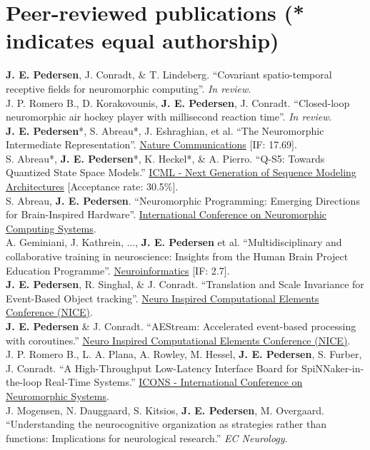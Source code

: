 \documentclass[11pt, a4paper]{article}
\newcommand{\years}[1]{\marginnote{\scriptsize #1}}
\begin{document}
\section*{Peer-reviewed publications {\small (* indicates equal authorship)}}
\years{2025}\textbf{J. E. Pedersen}, J. Conradt, \& T. Lindeberg. ``Covariant spatio-temporal receptive fields for neuromorphic computing''. \emph{In review}. \\
\years{2025}J. P. Romero B., D. Korakovounis, \textbf{J. E. Pedersen}, J. Conradt. ``Closed-loop neuromorphic air hockey player with millisecond reaction time''. \emph{In review}. \\
\years{2024}\textbf{J. E. Pedersen}*, S. Abreau*, J. Eshraghian, et al. ``The Neuromorphic Intermediate Representation''.
\href{https://www.nature.com/ncomms/}{Nature Communications} [IF: 17.69]. \\
\years{2024} S. Abreau*, \textbf{J. E. Pedersen}*, K. Heckel*, \& A. Pierro. ``Q-S5: Towards Quantized State Space Models.''
\href{https://icml.cc/virtual/2024/workshop/29962}{ICML - Next Generation of Sequence Modeling Architectures} [Acceptance rate: 30.5\%]. \\
\years{2024} S. Abreau, \textbf{J. E. Pedersen}.
``Neuromorphic Programming: Emerging Directions for Brain-Inspired Hardware''.
\href{https://iconsneuromorphic.cc/}{International Conference on Neuromorphic Computing Systems}. \\
\years{2024} A. Geminiani, J. Kathrein, ..., \textbf{J. E. Pedersen} et al. ``Multidisciplinary and collaborative training in neuroscience: Insights from the Human Brain Project Education Programme''. \href{https://link.springer.com/journal/12021}{Neuroinformatics} [IF: 2.7]. \\
\years{2023} \textbf{J. E. Pedersen}, R. Singhal, \& J. Conradt.
``Translation and Scale Invariance for Event-Based Object tracking''.
\href{https://niceworkshop.org/}{Neuro Inspired Computational Elements Conference (NICE)}. \\
\years{2023} \textbf{J. E. Pedersen} \& J. Conradt.
``AEStream: Accelerated event-based processing with coroutines.''
\href{https://niceworkshop.org/}{Neuro Inspired Computational Elements Conference (NICE)}. \\
\years{2023} J. P. Romero B., L. A. Plana, A. Rowley, M. Hessel, \textbf{J. E. Pedersen}, S. Furber, J. Conradt.
``A High-Throughput Low-Latency Interface Board for SpiNNaker-in-the-loop Real-Time Systems.''
\href{https://icons.ornl.gov/}{ICONS - International Conference on Neuromorphic Systems}. \\
\years{2018} J. Mogensen, N. Dauggaard, S. Kitsios, \textbf{J. E. Pedersen}, M. Overgaard.
``Understanding the neurocognitive organization as strategies rather than functions: Implications for neurological research.''
\emph{EC Neurology}.
\end{document}
